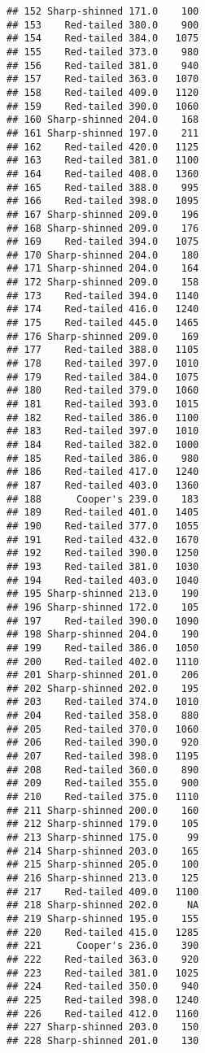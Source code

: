 \documentclass[
]{article}
\begin{document}
\begin{verbatim}
## 152 Sharp-shinned 171.0    100
## 153    Red-tailed 380.0    900
## 154    Red-tailed 384.0   1075
## 155    Red-tailed 373.0    980
## 156    Red-tailed 381.0    940
## 157    Red-tailed 363.0   1070
## 158    Red-tailed 409.0   1120
## 159    Red-tailed 390.0   1060
## 160 Sharp-shinned 204.0    168
## 161 Sharp-shinned 197.0    211
## 162    Red-tailed 420.0   1125
## 163    Red-tailed 381.0   1100
## 164    Red-tailed 408.0   1360
## 165    Red-tailed 388.0    995
## 166    Red-tailed 398.0   1095
## 167 Sharp-shinned 209.0    196
## 168 Sharp-shinned 209.0    176
## 169    Red-tailed 394.0   1075
## 170 Sharp-shinned 204.0    180
## 171 Sharp-shinned 204.0    164
## 172 Sharp-shinned 209.0    158
## 173    Red-tailed 394.0   1140
## 174    Red-tailed 416.0   1240
## 175    Red-tailed 445.0   1465
## 176 Sharp-shinned 209.0    169
## 177    Red-tailed 388.0   1105
## 178    Red-tailed 397.0   1010
## 179    Red-tailed 384.0   1075
## 180    Red-tailed 379.0   1060
## 181    Red-tailed 393.0   1015
## 182    Red-tailed 386.0   1100
## 183    Red-tailed 397.0   1010
## 184    Red-tailed 382.0   1000
## 185    Red-tailed 386.0    980
## 186    Red-tailed 417.0   1240
## 187    Red-tailed 403.0   1360
## 188      Cooper's 239.0    183
## 189    Red-tailed 401.0   1405
## 190    Red-tailed 377.0   1055
## 191    Red-tailed 432.0   1670
## 192    Red-tailed 390.0   1250
## 193    Red-tailed 381.0   1030
## 194    Red-tailed 403.0   1040
## 195 Sharp-shinned 213.0    190
## 196 Sharp-shinned 172.0    105
## 197    Red-tailed 390.0   1090
## 198 Sharp-shinned 204.0    190
## 199    Red-tailed 386.0   1050
## 200    Red-tailed 402.0   1110
## 201 Sharp-shinned 201.0    206
## 202 Sharp-shinned 202.0    195
## 203    Red-tailed 374.0   1010
## 204    Red-tailed 358.0    880
## 205    Red-tailed 370.0   1060
## 206    Red-tailed 390.0    920
## 207    Red-tailed 398.0   1195
## 208    Red-tailed 360.0    890
## 209    Red-tailed 355.0    900
## 210    Red-tailed 375.0   1110
## 211 Sharp-shinned 200.0    160
## 212 Sharp-shinned 179.0    105
## 213 Sharp-shinned 175.0     99
## 214 Sharp-shinned 203.0    165
## 215 Sharp-shinned 205.0    100
## 216 Sharp-shinned 213.0    125
## 217    Red-tailed 409.0   1100
## 218 Sharp-shinned 202.0     NA
## 219 Sharp-shinned 195.0    155
## 220    Red-tailed 415.0   1285
## 221      Cooper's 236.0    390
## 222    Red-tailed 363.0    920
## 223    Red-tailed 381.0   1025
## 224    Red-tailed 350.0    940
## 225    Red-tailed 398.0   1240
## 226    Red-tailed 412.0   1160
## 227 Sharp-shinned 203.0    150
## 228 Sharp-shinned 201.0    130

\end{verbatim}
\end{document}
